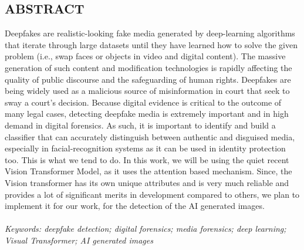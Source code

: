 \begin{center}


    \section*{ABSTRACT}
    \justify
    Deepfakes are realistic-looking fake media generated by deep-learning algorithms that iterate through large datasets until
    they have learned how to solve the given problem (i.e., swap faces or objects in video and digital content). The massive generation
    of such content and modification technologies is rapidly affecting the quality of public discourse and the safeguarding of
    human rights. Deepfakes are being widely used as a malicious source of misinformation in court that seek to sway a court’s decision.
    Because digital evidence is critical to the outcome of many legal cases, detecting deepfake media is extremely important and in high demand in digital forensics.
    As such, it is important to identify and build a classifier that can accurately distinguish between authentic and disguised media, especially in facial-recognition systems
    as it can be used in identity protection too. This is what we tend to do. In this work, 
    we will be using the quiet recent Vision Transformer Model, as it uses the attention based mechanism. Since, the Vision transformer has its own unique attributes and is very much reliable and provides a lot of significant merits in development compared to others, we plan to implement it for our work, for the detection of the AI generated images.\\
    \vspace{3 in}
    \\ \textit{Keywords: deepfake detection; digital forensics; media forensics; deep learning; Visual Transformer; AI generated images}


\end{center}